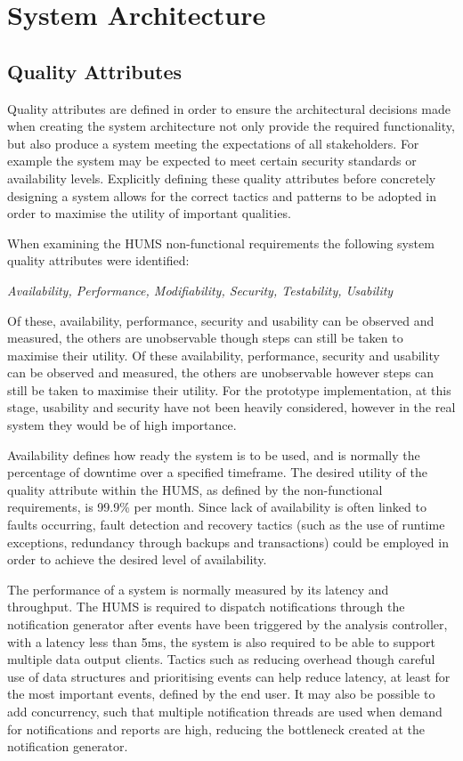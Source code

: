\documentclass[10pt,a4paper]{article}
\begin{document}


\section{System Architecture}
\subsection{Quality Attributes}
Quality attributes are defined in order to ensure the architectural decisions made when creating the system architecture not only provide the required functionality, but also produce a system meeting the expectations of all stakeholders. For example the system may be expected to meet certain security standards or availability levels. Explicitly defining these quality attributes before concretely designing a system allows for the correct tactics and patterns to be adopted in order to maximise the utility of important 
qualities.

When examining the HUMS non-functional requirements the following system quality attributes were identified:
	\begin{center}
	\textit{
		Availability, Performance, Modifiability, Security, Testability, Usability}
	\end{center}
Of these, availability, performance, security and usability can be observed and measured, the others are unobservable though steps can still be taken to maximise their utility.
Of these availability, performance, security and usability can be observed and measured, the others are unobservable however steps can still be taken to maximise their utility. For the prototype implementation, at this stage, usability and security have not been heavily considered, however in the real system they would be of high importance.

Availability defines how ready the system is to be used, and is normally the percentage of downtime over a specified timeframe. The desired utility of the quality attribute within the HUMS, as defined by the non-functional requirements, is  99.9\% per month. Since lack of availability is often linked to faults occurring, fault detection and recovery tactics (such as the use of runtime exceptions, redundancy through backups and transactions) could be employed in order to achieve the desired level of availability. 

The performance of a system is normally measured by its latency and throughput. The HUMS is required to dispatch notifications through the notification generator after events have been triggered by the analysis controller, with a latency less than 5ms, the system is 
also required to be able to support multiple data output clients. Tactics such as reducing overhead though careful use of data structures and prioritising events can help reduce latency, at least for the most important events, defined by the end user. It may also be possible to add concurrency, such that multiple notification threads are used when demand for notifications and reports are high, reducing the bottleneck created at the notification generator.
\end{document}

